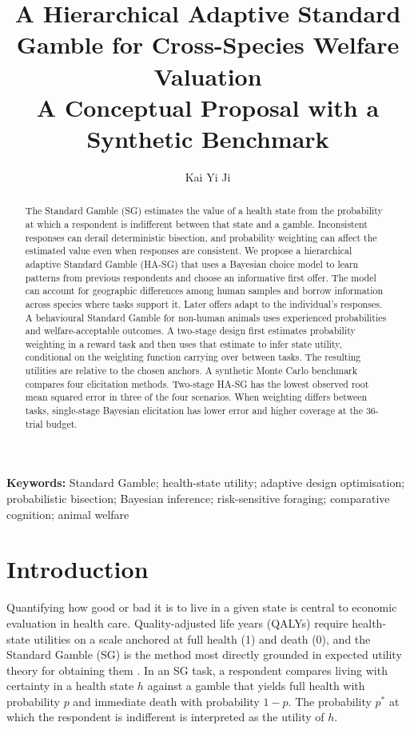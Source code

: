 \documentclass[11pt,a4paper]{article}
\title{A Hierarchical Adaptive Standard Gamble for Cross-Species Welfare Valuation\\
\large A Conceptual Proposal with a Synthetic Benchmark}
\author{Kai Yi Ji}
\date{}
\begin{document}
\maketitle

\begin{abstract}
The Standard Gamble (SG) estimates the value of a health state from the probability at which a respondent is indifferent between that state and a gamble. Inconsistent responses can derail deterministic bisection, and probability weighting can affect the estimated value even when responses are consistent. We propose a hierarchical adaptive Standard Gamble (HA-SG) that uses a Bayesian choice model to learn patterns from previous respondents and choose an informative first offer. The model can account for geographic differences among human samples and borrow information across species where tasks support it. Later offers adapt to the individual's responses. A behavioural Standard Gamble for non-human animals uses experienced probabilities and welfare-acceptable outcomes. A two-stage design first estimates probability weighting in a reward task and then uses that estimate to infer state utility, conditional on the weighting function carrying over between tasks. The resulting utilities are relative to the chosen anchors.
 A synthetic Monte Carlo benchmark compares four elicitation methods. Two-stage HA-SG has the lowest observed root mean squared error in three of the four scenarios. When weighting differs between tasks, single-stage Bayesian elicitation has lower error and higher coverage at the 36-trial budget.
\end{abstract}

\noindent\textbf{Keywords:} Standard Gamble; health-state utility; adaptive design optimisation; probabilistic bisection; Bayesian inference; risk-sensitive foraging; comparative cognition; animal welfare

\section{Introduction}
\label{sec:intro}

Quantifying how good or bad it is to live in a given state is central to economic evaluation in health care. Quality-adjusted life years (QALYs) require health-state utilities on a scale anchored at full health (1) and death (0), and the Standard Gamble (SG) is the method most directly grounded in expected utility theory for obtaining them \citep{vonneumann1944,torrance1986,drummond2015,brazier2017}. In an SG task, a respondent compares living with certainty in a health state $h$ against a gamble that yields full health with probability $p$ and immediate death with probability $1-p$. The probability $p^\ast$ at which the respondent is indifferent is interpreted as the utility of $h$.
\end{document}
